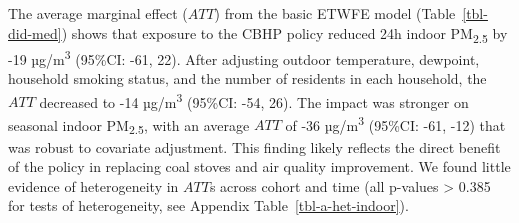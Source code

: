 \documentclass[
  letterpaper,
  DIV=11,
  numbers=noendperiod]{scrartcl}
\begin{document}
The average marginal effect (\(ATT\)) from the basic ETWFE model
(Table~\ref{tbl-did-med}) shows that exposure to the CBHP policy reduced
24h indoor PM\textsubscript{2.5} by -19 µg/m\textsuperscript{3} (95\%CI:
-61, 22). After adjusting outdoor temperature, dewpoint, household
smoking status, and the number of residents in each household, the
\(ATT\) decreased to -14 µg/m\textsuperscript{3} (95\%CI: -54, 26). The
impact was stronger on seasonal indoor PM\textsubscript{2.5}, with an
average \(ATT\) of -36 µg/m\textsuperscript{3} (95\%CI: -61, -12) that
was robust to covariate adjustment. This finding likely reflects the
direct benefit of the policy in replacing coal stoves and air quality
improvement. We found little evidence of heterogeneity in \(ATT\)s
across cohort and time (all p-values \textgreater{} 0.385 for tests of
heterogeneity, see Appendix Table~\ref{tbl-a-het-indoor}).
\end{document}
